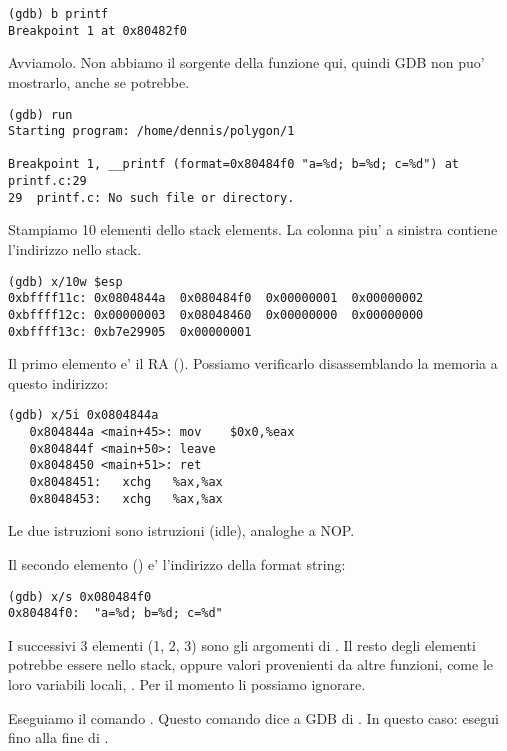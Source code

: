 \begin{lstlisting}[caption=impostiamo un breakpoint su \printf]
(gdb) b printf
Breakpoint 1 at 0x80482f0
\end{lstlisting}

Avviamolo.
Non abbiamo il sorgente della funzione \printf qui, quindi \ac{GDB} non puo' mostrarlo, anche se potrebbe.

\begin{lstlisting}
(gdb) run
Starting program: /home/dennis/polygon/1 

Breakpoint 1, __printf (format=0x80484f0 "a=%d; b=%d; c=%d") at printf.c:29
29	printf.c: No such file or directory.
\end{lstlisting}

Stampiamo 10 elementi dello stack elements. La colonna piu' a sinistra contiene l'indirizzo nello stack.

\begin{lstlisting}
(gdb) x/10w $esp
0xbffff11c:	0x0804844a	0x080484f0	0x00000001	0x00000002
0xbffff12c:	0x00000003	0x08048460	0x00000000	0x00000000
0xbffff13c:	0xb7e29905	0x00000001
\end{lstlisting}

Il primo elemento e' il \ac{RA} ().
Possiamo verificarlo disassemblando la memoria a questo indirizzo:

\begin{lstlisting}[label=NOP_as_XCHG_example]
(gdb) x/5i 0x0804844a
   0x804844a <main+45>:	mov    $0x0,%eax
   0x804844f <main+50>:	leave  
   0x8048450 <main+51>:	ret    
   0x8048451:	xchg   %ax,%ax
   0x8048453:	xchg   %ax,%ax
\end{lstlisting}

Le due istruzioni  sono istruzioni  (idle), analoghe a \ac{NOP}.

Il secondo elemento () e' l'indirizzo della format string:

\begin{lstlisting}
(gdb) x/s 0x080484f0
0x80484f0:	"a=%d; b=%d; c=%d"
\end{lstlisting}

I successivi 3 elementi (1, 2, 3) sono gli argomenti di \printf.
Il resto degli elementi potrebbe essere  nello stack, oppure valori provenienti da altre funzioni, come le loro variabili locali,  \etc{}.
Per il momento li possiamo ignorare.

Eseguiamo il comando . 
Questo comando dice a GDB di .
In questo caso: esegui fino alla fine di \printf.

